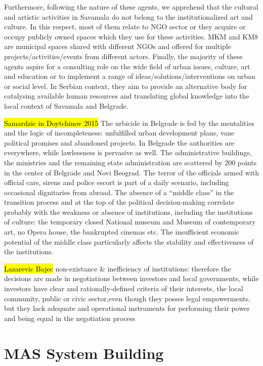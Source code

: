\documentclass[11pt]{report}
\begin{document}
Furthermore, following the nature of these agents, we apprehend that the cultural and artistic activities in Savamala do not belong to the institutionalized art and culture. In this respect, most of them relate to NGO sector or they acquire or occupy publicly owned spaces which they use for these activities. MKM and KM8 are municipal spaces shared with different NGOs and offered for multiple projects/activities/events from different actors. Finally, the majority of these agents aspire for a consulting role on the wide field of urban issues, culture, art and education or to implement a range of ideas/solutions/interventions on urban or social level. In Serbian context, they aim to provide an alternative body for catalysing available human resources and translating global knowledge into the local context of Savamala and Belgrade.

\hl{Samardzic in Doytchinov 2015} 
The  urbicide  in  Belgrade  is  fed  by  the  mentalities and  the  logic  of  incompleteness:  unfulfilled  urban development  plans,  vane  political  promises  and abandoned  projects.
In  Belgrade  the  authorities  are  everywhere,  while  lawlessness  is  pervasive as well. The administrative buildings, the ministries and the remaining state administration are scattered by 200 points in the center of Belgrade and Novi Beograd. The terror of the officials armed with official cars, sirens and police escort is part of a daily scenario, including occasional dignitaries from abroad. 
The absence of a “middle class” in the transition process and at the top of the political decision-making correlate probably with the weakness or absence of institutions, including the institutions of culture: the temporary closed National museum and Museum of contemporary art, no Opera house, the bankrupted cinemas etc. The insufficient economic potential of the middle class particularly affects the stability and effectiveness of the institutions. 

\hl{Lazarevic Bajec}
non-existance & inefficiency of institutions: therefore the decisions are made in negotiations between investors and local governments, while investors have clear and rationally-defined criteria of their interests, the local community, public or civic sector,even though they posses legal empowerments, but they lack adequate and operational instruments for performing their power and being equal in the negotiation process

\chapter{MAS System Building}
\end{document}
